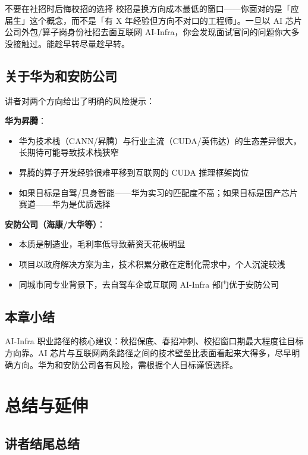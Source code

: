 \documentclass[a4paper]{article}
\begin{document}
\begin{warningbox}{不要在社招时后悔校招的选择}
校招是换方向成本最低的窗口——你面对的是「应届生」这个概念，而不是「有 X 年经验但方向不对口的工程师」。一旦以 AI 芯片公司外包/算子岗身份社招去面互联网 AI-Infra，你会发现面试官问的问题你大多没接触过。能趁早转尽量趁早转。
\end{warningbox}

\subsection{关于华为和安防公司}

讲者对两个方向给出了明确的风险提示：

\textbf{华为昇腾}：
\begin{itemize}
    \item 华为技术栈（CANN/昇腾）与行业主流（CUDA/英伟达）的生态差异很大，长期待可能导致技术栈狭窄
    \item 昇腾的算子开发经验很难平移到互联网的 CUDA 推理框架岗位
    \item 如果目标是自驾/具身智能——华为实习的匹配度不高；如果目标是国产芯片赛道——华为是优质选择
\end{itemize}

\textbf{安防公司（海康/大华等）}：
\begin{itemize}
    \item 本质是制造业，毛利率低导致薪资天花板明显
    \item 项目以政府解决方案为主，技术积累分散在定制化需求中，个人沉淀较浅
    \item 同城市同专业背景下，去自驾车企或互联网 AI-Infra 部门优于安防公司
\end{itemize}

\subsection{本章小结}
AI-Infra 职业路径的核心建议：秋招保底、春招冲刺、校招窗口期最大程度往目标方向靠。AI 芯片与互联网两条路径之间的技术壁垒比表面看起来大得多，尽早明确方向。华为和安防公司各有风险，需根据个人目标谨慎选择。

\section{总结与延伸}

\subsection{讲者结尾总结}
\end{document}
